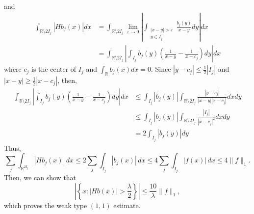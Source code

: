 and
$$
\begin{aligned}
\int_{\mathbb{R} \setminus 2I_j}|Hb_j(x)| dx &= \int_{\mathbb{R} \setminus 2I_j} \lim_{\varepsilon \rightarrow 0} \left| \int_{\substack{|x-y|>\varepsilon \\ y \in I_j}} \frac{b_j(y)}{x-y} dy \right| dx \\
&= \int_{\mathbb{R} \setminus 2I_j} \left| \int_{I_j} b_j(y) \left( \frac{1}{x-y} - \frac{1}{x-c_j} \right) dy \right| dx
\end{aligned}
$$
where $c_j$ is the center of $I_j$ and $\int_{\mathbb{R}} b_j(x) dx = 0$. Since $|y -c_j| \leq \frac{1}{2} |I_j|$ and $|x-y| \geq \frac{1}{2} |x-c_j|$, then,
$$
\begin{aligned}
\int_{\mathbb{R} \setminus 2I_j} \left| \int_{I_j} b_j(y) \left( \frac{1}{x-y} - \frac{1}{x-c_j} \right) dy \right| dx &\leq \int_{I_j} |b_j(y)| \int_{\mathbb{R} \setminus 2I_j} \frac{|y-c_j|}{|x-y||x-c_j|} dx dy \\
&\leq \int_{I_j} |b_j(y)| \int_{\mathbb{R} \setminus 2I_j} \frac{|I_j|}{|x-c_j|^2} dx dy \\
&= 2 \int_{I_j} |b_j(y)| dy
\end{aligned}
$$
Thus,
\[  
\sum_j \int_{\mathbb{R}^{2I_j}} |Hb_j(x)| \, dx \leqslant 2 \sum_j \int_{I_j} |b_j(x)| \, dx \leqslant 4 \sum_j \int_{I_j} |f(x)| \, dx \leqslant 4\|f\|_1.  
\]  
Then, we can show that  
\[  
\left|\left\{ x : |Hb(x)| > \frac{\lambda}{2} \right\}\right| \leq \frac{10}{\lambda}\|f\|_1,  
\]  
which proves the weak type $(1,1)$ estimate. \\ 
  
